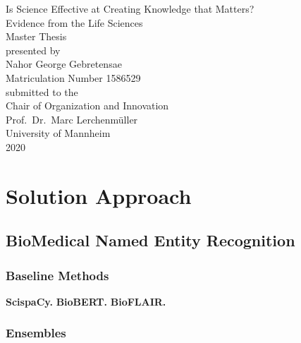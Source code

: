 \documentclass[11pt,titlepage,oneside,openany]{book}
\begin{document}
\begin{titlepage}
	\vspace*{2cm}
  \begin{center}
   {\Large Is Science Effective at Creating Knowledge that Matters?\\
	\small Evidence from the Life Sciences\\}
   \vspace{2cm} 
   {Master Thesis\\}
   \vspace{2cm}
   {presented by\\
    Nahor George Gebretensae\\
		Matriculation Number 1586529\\
   }
   \vspace{1cm} 
   {submitted to the\\
    Chair of Organization and Innovation\\
    Prof.\ Dr.\ Marc Lerchenmüller\\
    University of Mannheim\\} \vspace{2cm}
   {2020}
  \end{center}
\end{titlepage}


\tableofcontents
\listoffigures
\listoftables


\newpage





\chapter{Solution Approach}
\label{cha:solution}

\section{BioMedical Named Entity Recognition}
\subsection{Baseline Methods}

\textbf{ScispaCy.}
\textbf{BioBERT.}
\textbf{BioFLAIR.}

\subsection{Ensembles}
\end{document}
